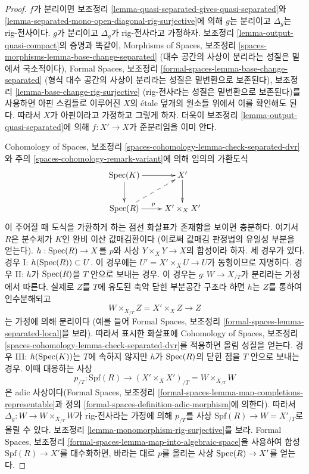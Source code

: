 \begin{proof}
$f$가 분리이면 보조정리
\ref{lemma-quasi-separated-gives-quasi-separated}와
\ref{lemma-separated-mono-open-diagonal-rig-surjective}에 의해
$g$는 분리이고 $\Delta_g$는 rig-전사이다.
$g$가 분리이고 $\Delta_g$가 rig-전사라고 가정하자.
보조정리 \ref{lemma-output-quasi-compact}의 증명과 똑같이,
Morphisms of Spaces, 보조정리
\ref{spaces-morphisms-lemma-base-change-separated}
(대수 공간의 사상이 분리라는 성질은 밑에서 국소적이다),
Formal Spaces, 보조정리
\ref{formal-spaces-lemma-base-change-separated}
(형식 대수 공간의 사상이 분리라는 성질은 밑변환으로 보존된다),
보조정리 \ref{lemma-base-change-rig-surjective}
(rig-전사라는 성질은 밑변환으로 보존된다)를 사용하면
아핀 스킴들로 이루어진 $X$의 \'etale 덮개의 원소들 위에서
이를 확인해도 된다. 따라서 $X$가 아핀이라고 가정하고 그렇게 하자.
더욱이 보조정리 \ref{lemma-output-quasi-separated}에 의해
$f : X' \to X$가 준분리임을 이미 안다.

\medskip\noindent
Cohomology of Spaces, 보조정리
\ref{spaces-cohomology-lemma-check-separated-dvr}와
주의 \ref{spaces-cohomology-remark-variant}에 의해
임의의 가환도식
$$
\xymatrix{
\Spec(K) \ar[r] \ar[d] & X' \ar[d] \\
\Spec(R) \ar[r]^p \ar@{-->}[ru] & X' \times_X X'
}
$$
이 주어질 때 도식을 가환하게 하는 점선 화살표가 존재함을 보이면 충분하다.
여기서 $R$은 분수체가 $K$인 완비 이산 값매김환이다
(이로써 값매김 판정법의 유일성 부분을 얻는다).
$h : \mathop{\mathrm{Spec}}(R) \to X$를 $p$와 사상
$Y \times_X Y \to X$의 합성이라 하자. 세 경우가 있다.
경우 I: $h(\mathop{\mathrm{Spec}}(R)) \subset U$. 이 경우에는
$U' = X' \times_X U \to U$가 동형이므로 자명하다.
경우 II: $h$가 $\mathop{\mathrm{Spec}}(R)$을 $T$ 안으로 보내는 경우.
이 경우는 $g : W \to X_{/T}$가 분리라는 가정에서 따른다.
실제로 $Z$를 $T$에 유도된 축약 닫힌 부분공간 구조라 하면
$h$는 $Z$를 통하여 인수분해되고
$$
W \times_{X_{/T}} Z = X' \times_X Z \longrightarrow Z
$$
는 가정에 의해 분리이다
(예를 들어 Formal Spaces, 보조정리
\ref{formal-spaces-lemma-separated-local}을 보라).
따라서 표시한 화살표에 Cohomology of Spaces, 보조정리
\ref{spaces-cohomology-lemma-check-separated-dvr}를 적용하면
올림 성질을 얻는다.
경우 III: $h(\mathop{\mathrm{Spec}}(K))$는 $T$에 속하지 않지만
$h$가 $\mathop{\mathrm{Spec}}(R)$의 닫힌 점을 $T$ 안으로 보내는 경우.
이때 대응하는 사상
$$
p_{/T} :
\text{Spf}(R)
\longrightarrow
(X' \times_X X')_{/T} =
W \times_{X_{/T}} W
$$
은 adic 사상이다(Formal Spaces, 보조정리
\ref{formal-spaces-lemma-map-completions-representable}과
정의 \ref{formal-spaces-definition-adic-morphism}에 의한다).
따라서 $\Delta_g : W \to W \times_{X_{/T}} W$가
rig-전사라는 가정에 의해 $p_{/T}$를 사상
$\text{Spf}(R) \to W = X'_{/T}$로 올릴 수 있다.
보조정리 \ref{lemma-monomorphism-rig-surjective}를 보라.
Formal Spaces, 보조정리
\ref{formal-spaces-lemma-map-into-algebraic-space}을 사용하여
합성 $\text{Spf}(R) \to X'$를 대수화하면,
바라는 대로 $p$를 올리는 사상 $\mathop{\mathrm{Spec}}(R) \to X'$를 얻는다.
\end{proof}

